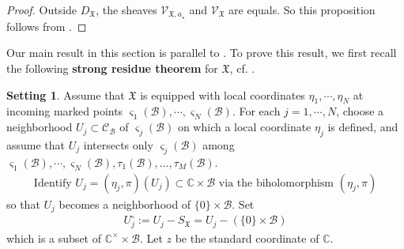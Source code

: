 \documentclass[11pt,b5paper,notitlepage]{article}
\theoremstyle{definition}
\newtheorem{rem}[df]{Remark}
\newtheorem{sett}[df]{Setting}
\theoremstyle{plain}
\newcommand{\fk}{\mathfrak}
\newcommand{\mc}{\mathcal}
\newcommand{\SV}{\mathscr{V}}
\newcommand{\scr}{\mathscr}
\newcommand{\DX}{D_{\fk X}}
\newcommand{\Vbb}{\mathbb V}
\newcommand{\Wbb}{\mathbb W}
\newcommand{\Cbb}{\mathbb C}
\newcommand{\<}{\left\langle}
\renewcommand{\>}{\right\rangle}
\newcommand{\MC}{\mathcal{C}}
\newcommand{\MB}{\mathcal{B}}
\newcommand{\fx}{\mathfrak{X}}
\newcommand{\SW}{\mathscr{W}}
\numberwithin{equation}{subsection}
\begin{document}
\begin{proof}
Outside $\DX$, the sheaves $\scr V_{\fk X,a_\star}$ and $\scr V_{\fk X}$ are equals. So this proposition follows from \cite[Prop. 6.2]{Gui-propagation}.  %
\end{proof} 
\begin{comment}
\begin{rem}
   Since 
   $$
   \SV_{\fx,a_1,\cdots,a_M}\otimes \pi^*\SW_\fx(\Wbb)\simeq \SV_{\fx,a_1,\cdots,a_M}\otimes_\Cbb \SW_\fx(\Wbb),
   $$
   we can use
   $$
   \SW_{\wr\fx}(\Vbb\otimes \Wbb)\simeq \SV_{\fx,a_1,\cdots,a_M}\vert_{\MC-S_\fx}\otimes_\Cbb \SW_\fx(\Wbb)
   $$
   instead of Prop. \ref{equivalence3}.
\end{rem}
\end{comment}

Our main result in this section is parallel to \cite[Thm. 7.1]{Gui-propagation}. %
To prove this result, we first  recall the following \textbf{strong residue theorem} for $\fk X$, cf. \cite[Thm. A.1]{Gui-propagation}. 


\begin{sett}\label{lb12}
Assume that $\fx$ is equipped with local coordinates $\eta_1,\cdots,\eta_N$ at incoming marked points $\varsigma_1(\MB),\cdots,\varsigma_N(\MB)$. For each $j=1,\cdots, N$, choose a neighborhood $U_j\subset \MC_{\MB}$ of $\varsigma_j(\MB)$ on which a local coordinate $\eta_j$ is defined, and assume that $U_j$ intersects only $\varsigma_j(\MB)$ among $\varsigma_1(\MB),\cdots,\varsigma_N(\MB),\tau_1(\mc B),\dots,\tau_M(\mc B)$. 
\begin{gather}
\text{Identify $U_j=(\eta_j,\pi)(U_j)\subset \Cbb\times \MB$ via the biholomorphism $(\eta_j,\pi)$}
\end{gather}
so that $U_j$ becomes a neighborhood of $\{0\}\times \MB$. Set
\begin{align}
U_j^\circ:=U_j-S_\fx=U_j-(\{0\}\times \MB)
\end{align}
which is a subset of $\Cbb^\times \times \MB$. Let $z$ be the standard coordinate of $\Cbb$.
\end{sett}
\end{document}
